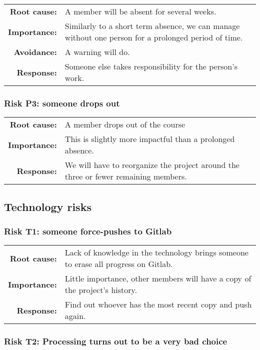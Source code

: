 \begin{tabularx}{\textwidth}{rX}
\textbf{Root cause:} & A member will be absent for several weeks. \\
\textbf{Importance:} & Similarly to a short term absence, we can manage without one person for a prolonged period of time. \\
\textbf{Avoidance:} & A warning will do. \\
\textbf{Response:} & Someone else takes responsibility for the person’s work. \\
\end{tabularx}

\subsubsection{Risk P3: someone drops out}

\begin{tabularx}{\textwidth}{rX}
\textbf{Root cause:} & A member drops out of the course \\
\textbf{Importance:} & This is slightly more impactful than a prolonged absence. \\
\textbf{Response:} & We will have to reorganize the project around the three or fewer remaining members. \\
\end{tabularx}

\subsection{Technology risks}

\subsubsection{Risk T1: someone force-pushes to Gitlab}

\begin{tabularx}{\textwidth}{rX}
\textbf{Root cause:} & Lack of knowledge in the technology brings someone to erase all progress on Gitlab. \\
\textbf{Importance:} & Little importance, other members will have a copy of the project’s history. \\
\textbf{Response:} & Find out whoever has the most recent copy and push again. \\
\end{tabularx}

\subsubsection{Risk T2: Processing turns out to be a very bad choice}

